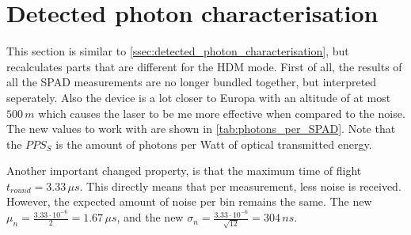 \section{Detected photon characterisation}\label{ssec:HDM_detected_photon_characterisation}
This section is similar to \cref{ssec:detected_photon_characterisation}, but recalculates parts that are different for the HDM mode. First of all, the results of all the SPAD measurements are no longer bundled together, but interpreted seperately. Also the device is a lot closer to Europa with an altitude of at most $500\,m$ which causes the laser to be me more effective when compared to the noise. The new values to work with are shown in \cref{tab:photons_per_SPAD}. Note that the $PPS_S$ is the amount of photons per Watt of optical transmitted energy.




Another important changed property, is that the maximum time of flight $t_{round}=3.33\,\mu s$. This directly means that per measurement, less noise is received. However, the expected amount of noise per bin remains the same. The new $\mu_n=\frac{3.33\cdot10^{-6}}{2}=1.67\,\mu s$, and the new $\sigma_n=\frac{3.33\cdot10^{-6}}{\sqrt{12}}=304\,ns$. 
